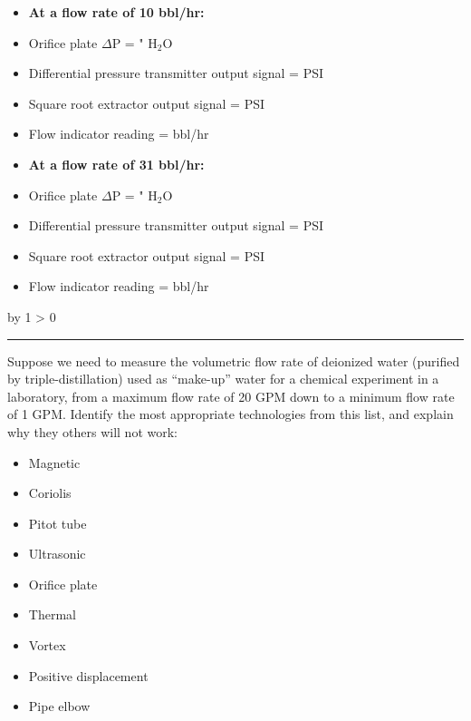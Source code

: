 \documentclass[12pt,a4paper]{article}
\def\oppgave{
            \advance\questnum by 1
            \ifnum \questnum > 0
                 \hrule
                 \vskip 3pt
                 \leftline{Oppgave \the\questnum}
                 \vskip 3pt \fi}
\begin{document}
\begin{itemize}
\item {} {\bf At a flow rate of 10 bbl/hr:}
\vskip 5pt
\item{} Orifice plate $\Delta$P = \underbar{\hskip 50pt} " H$_{2}$O
\vskip 5pt
\item{} Differential pressure transmitter output signal = \underbar{\hskip 50pt} PSI
\vskip 5pt
\item{} Square root extractor output signal = \underbar{\hskip 50pt} PSI
\vskip 5pt
\item{} Flow indicator reading = \underbar{\hskip 50pt} bbl/hr
\end{itemize}

\vskip 10pt

\begin{itemize}
\item {} {\bf At a flow rate of 31 bbl/hr:}
\vskip 5pt
\item{} Orifice plate $\Delta$P = \underbar{\hskip 50pt} " H$_{2}$O
\vskip 5pt
\item{} Differential pressure transmitter output signal = \underbar{\hskip 50pt} PSI
\vskip 5pt
\item{} Square root extractor output signal = \underbar{\hskip 50pt} PSI
\vskip 5pt
\item{} Flow indicator reading = \underbar{\hskip 50pt} bbl/hr
\end{itemize}

\vskip 10pt \filbreak 
\oppgave{} 

Suppose we need to measure the volumetric flow rate of deionized water (purified by triple-distillation) used as ``make-up'' water for a chemical experiment in a laboratory, from a maximum flow rate of 20 GPM down to a minimum flow rate of 1 GPM.  Identify the most appropriate technologies from this list, and explain why they others will not work:

\begin{itemize}
\item{} Magnetic
\item{} Coriolis
\item{} Pitot tube
\item{} Ultrasonic
\item{} Orifice plate
\item{} Thermal
\item{} Vortex
\item{} Positive displacement
\item{} Pipe elbow
\end{itemize}
\end{document}
